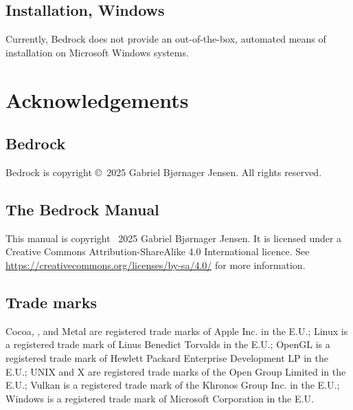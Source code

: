 \documentclass[a5paper, twoside]{report}
\begin{document}
		\section{Installation, Windows\textsuperscript{\textregistered}}
			\label{dev:windows-install}
			Currently, Bedrock does not provide an out-of-the-box, automated means of installation on Microsoft Windows systems.

	\clearpage
	\chapter{Acknowledgements}
		\label{acknowledge}
		\section{Bedrock}
			Bedrock is copyright \copyright\ 2025 Gabriel Bjørnager Jensen.
			All rights reserved.

		\section{The Bedrock Manual}
			This manual is copyright \textcopyright\ 2025 Gabriel Bjørnager Jensen.
			It is licensed under a Creative Commons Attribution-ShareAlike 4.0 International licence.
			See \url{https://creativecommons.org/licenses/by-sa/4.0/} for more information.

		\section{Trade marks}
			Cocoa, , and Metal are registered trade marks of Apple Inc. in the E.U.;
			Linux is a registered trade mark of Linus Benedict Torvalds in the E.U.;
			OpenGL is a registered trade mark of Hewlett Packard Enterprise Development LP in the E.U.;
			UNIX and X are registered trade marks of the Open Group Limited in the E.U.;
			Vulkan is a registered trade mark of the Khronos Group Inc. in the E.U.;
			Windows is a registered trade mark of Microsoft Corporation in the E.U.
\end{document}
